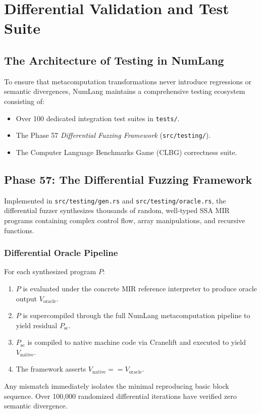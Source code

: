\chapter{Differential Validation and Test Suite}
\label{chap:testing}

\section{The Architecture of Testing in NumLang}
\label{sec:testing:intro}

To ensure that metacomputation transformations never introduce regressions or semantic divergences, NumLang maintains a comprehensive testing ecosystem consisting of:
\begin{itemize}
    \item Over 100 dedicated integration test suites in \texttt{tests/}.
    \item The Phase 57 \emph{Differential Fuzzing Framework} (\texttt{src/testing/}).
    \item The Computer Language Benchmarks Game (CLBG) correctness suite.
\end{itemize}

\section{Phase 57: The Differential Fuzzing Framework}
\label{sec:testing:fuzzer}

Implemented in \texttt{src/testing/gen.rs} and \texttt{src/testing/oracle.rs}, the differential fuzzer synthesizes thousands of random, well-typed SSA MIR programs containing complex control flow, array manipulations, and recursive functions.

\subsection{Differential Oracle Pipeline}
For each synthesized program $P$:
\begin{enumerate}
    \item $P$ is evaluated under the concrete MIR reference interpreter to produce oracle output $V_{\text{oracle}}$.
    \item $P$ is supercompiled through the full NumLang metacomputation pipeline to yield residual $P_{\text{sc}}$.
    \item $P_{\text{sc}}$ is compiled to native machine code via Cranelift and executed to yield $V_{\text{native}}$.
    \item The framework asserts $V_{\text{native}} == V_{\text{oracle}}$.
\end{enumerate}
Any mismatch immediately isolates the minimal reproducing basic block sequence. Over 100,000 randomized differential iterations have verified zero semantic divergence.

